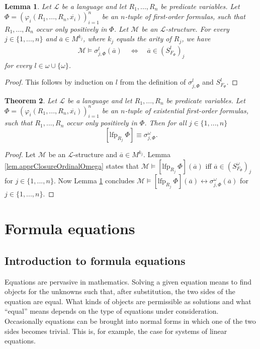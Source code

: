 \documentclass[acmsmall]{acmart}
\theoremstyle{plain}
\newtheorem{theorem}{Theorem}
\newtheorem{lemma}[theorem]{Lemma}
\theoremstyle{definition}
\newcommand{\calL}{\mathcal{L}}
\newcommand{\calM}{\mathcal{M}}
\newcommand{\mybar}[1]{\overline{#1}}
\newcommand{\lfp}{\mathrm{lfp}} %
\begin{document}
\begin{lemma}\label{lem.apprEquivSetsFormulas}
	Let $\calL$ be a language and let $R_1,...,R_n$ be predicate variables. Let $\Phi =  (\varphi_i(R_1,...,R_n,\mybar{x_i}))_{i=1}^n$ be an $n$-tuple of first-order formulas, such that $R_1,...,R_n$ occur only positively in $\Phi$. Let $\calM$ be an $\calL$-structure. For every $j \in \{1,...,n\}$ and $\mybar{a} \in M^{k_j}$, where $k_j$ equals the arity of $R_j$, we have
	\begin{align*}
		\calM \models \sigma_{j,\Phi}^l(\mybar{a}) \quad \Leftrightarrow \quad  \mybar{a} \in (S_{F_{\Phi}}^l)_j
	\end{align*}
	for every $l \in \omega \cup \{\omega\}$.
\end{lemma}
\begin{proof}
	This follows by induction on $l$ from the definition of $\sigma_{j,\Phi}^l$ and $S_{F_{\Phi}}^{l}$.
\end{proof}

\begin{theorem}\label{thm.apprLfp}
		Let $\calL$ be a language and let $R_1,...,R_n$ be predicate variables. Let $\Phi =  (\varphi_i(R_1,...,R_n,\mybar{x_i}))_{i=1}^n$ be an $n$-tuple of existential first-order formulas, such that $R_1,...,R_n$ occur only positively in $\Phi$. Then for all $j \in \{1,...,n\}$
		\[
		[\lfp_{R_j} ~\Phi] \equiv \sigma_{j,\Phi}^{\omega}.
		\]
\end{theorem}
\begin{proof}
	Let $\calM$ be an $\calL$-structure and $\mybar{a} \in M^{k_j}$. Lemma \ref{lem.apprClosureOrdinalOmega} states that $\calM \models [\lfp_{R_j} ~\Phi](\mybar{a})$ iff $\mybar{a} \in (S_{F_{\Phi}}^{\omega})_j$ for $j \in \{1,...,n\}$. Now Lemma \ref{lem.apprEquivSetsFormulas} concludes $\calM \models [\lfp_{R_j} ~\Phi](\mybar{a}) \leftrightarrow \sigma_{j,\Phi}^{\omega}(\mybar{a})$ for $j \in \{1,...,n\}$.
\end{proof}


  
\section{Formula equations}\label{sec.form_eq}

\subsection{Introduction to formula equations}

Equations are pervasive in mathematics.
Solving a given equation means to find objects for the unknowns such that, after substitution,
 the two sides of the  equation are equal.
What kinds of objects are permissible as solutions and what ``equal'' means depends on the
 type of equations under consideration.
Occasionally equations can be brought into normal forms in which one of the two sides becomes
 trivial.
This is, for example, the case for systems of linear equations.
\end{document}
